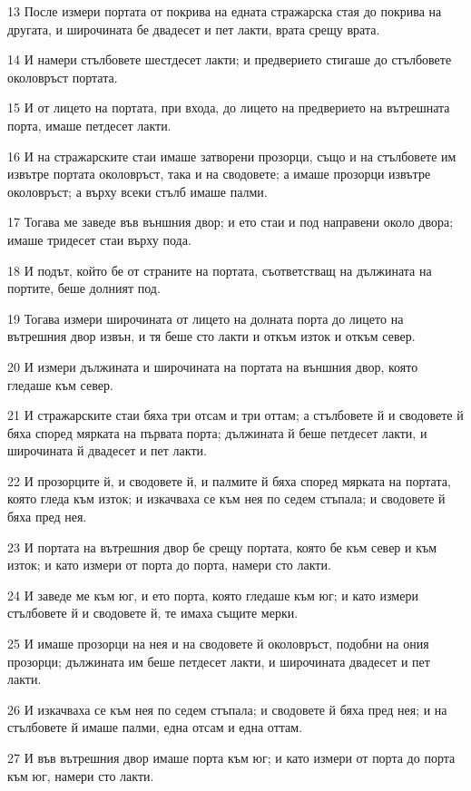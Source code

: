 \par 13 После измери портата от покрива на едната стражарска стая до покрива на другата, и широчината бе двадесет и пет лакти, врата срещу врата.
\par 14 И намери стълбовете шестдесет лакти; и предверието стигаше до стълбовете околовръст портата.
\par 15 И от лицето на портата, при входа, до лицето на предверието на вътрешната порта, имаше петдесет лакти.
\par 16 И на стражарските стаи имаше затворени прозорци, също и на стълбовете им извътре портата околовръст, така и на сводовете; а имаше прозорци извътре околовръст; а върху всеки стълб имаше палми.
\par 17 Тогава ме заведе във външния двор; и ето стаи и под направени около двора; имаше тридесет стаи върху пода.
\par 18 И подът, който бе от страните на портата, съответстващ на дължината на портите, беше долният под.
\par 19 Тогава измери широчината от лицето на долната порта до лицето на вътрешния двор извън, и тя беше сто лакти и откъм изток и откъм север.
\par 20 И измери дължината и широчината на портата на външния двор, която гледаше към север.
\par 21 И стражарските стаи бяха три отсам и три оттам; а стълбовете й и сводовете й бяха според мярката на първата порта; дължината й беше петдесет лакти, и широчината й двадесет и пет лакти.
\par 22 И прозорците й, и сводовете й, и палмите й бяха според мярката на портата, която гледа към изток; и изкачваха се към нея по седем стъпала; и сводовете й бяха пред нея.
\par 23 И портата на вътрешния двор бе срещу портата, която бе към север и към изток; и като измери от порта до порта, намери сто лакти.
\par 24 И заведе ме към юг, и ето порта, която гледаше към юг; и като измери стълбовете й и сводовете й, те имаха същите мерки.
\par 25 И имаше прозорци на нея и на сводовете й околовръст, подобни на ония прозорци; дължината им беше петдесет лакти, и широчината двадесет и пет лакти.
\par 26 И изкачваха се към нея по седем стъпала; и сводовете й бяха пред нея; и на стълбовете й имаше палми, една отсам и една оттам.
\par 27 И във вътрешния двор имаше порта към юг; и като измери от порта до порта към юг, намери сто лакти.
